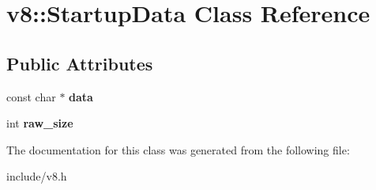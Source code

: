 \hypertarget{classv8_1_1_startup_data}{}\section{v8\+:\+:Startup\+Data Class Reference}
\label{classv8_1_1_startup_data}
\subsection*{Public Attributes}
\begin{DoxyCompactItemize}
\item 
const char $\ast$ {\bfseries data}\hypertarget{classv8_1_1_startup_data_a8daf0c5282d7c465988757dc4ecda1af}{}\label{classv8_1_1_startup_data_a8daf0c5282d7c465988757dc4ecda1af}

\item 
int {\bfseries raw\+\_\+size}\hypertarget{classv8_1_1_startup_data_a2f797e167b2bebd18ddca83dedda6ffa}{}\label{classv8_1_1_startup_data_a2f797e167b2bebd18ddca83dedda6ffa}

\end{DoxyCompactItemize}


The documentation for this class was generated from the following file\+:\begin{DoxyCompactItemize}
\item 
include/v8.\+h\end{DoxyCompactItemize}
